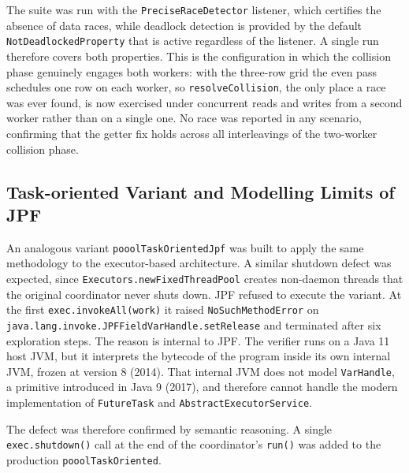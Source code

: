 \documentclass{scrartcl}
\begin{document}
The suite was run with the \texttt{PreciseRaceDetector} listener, which certifies the absence of data races, while deadlock detection is provided by the default \texttt{NotDeadlockedProperty} that is active regardless of the listener. A single run therefore covers both properties. This is the configuration in which the collision phase genuinely engages both workers: with the three-row grid the even pass schedules one row on each worker, so \texttt{resolveCollision}, the only place a race was ever found, is now exercised under concurrent reads and writes from a second worker rather than on a single one. No race was reported in any scenario, confirming that the getter fix holds across all interleavings of the two-worker collision phase.

\subsection{Task-oriented Variant and Modelling Limits of JPF}

An analogous variant \texttt{pooolTaskOrientedJpf} was built to apply the same methodology to the executor-based architecture. A similar shutdown defect was expected, since \texttt{Executors.newFixedThreadPool} creates non-daemon threads that the original coordinator never shuts down. JPF refused to execute the variant. At the first \texttt{exec.invokeAll(work)} it raised \texttt{NoSuchMethodError} on \texttt{java.lang.invoke.JPFFieldVarHandle.setRelease} and terminated after six exploration steps. The reason is internal to JPF. The verifier runs on a Java 11 host JVM, but it interprets the bytecode of the program inside its own internal JVM, frozen at version 8 (2014). That internal JVM does not model \texttt{VarHandle}, a primitive introduced in Java 9 (2017), and therefore cannot handle the modern implementation of \texttt{FutureTask} and \texttt{AbstractExecutorService}.

The defect was therefore confirmed by semantic reasoning. A single \texttt{exec.shutdown()} call at the end of the coordinator's \texttt{run()} was added to the production \texttt{pooolTaskOriented}.
\end{document}
